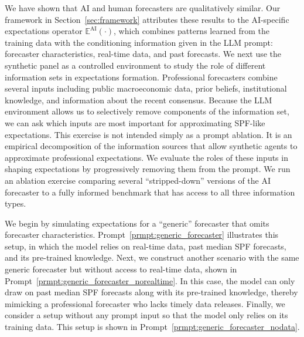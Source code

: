 \documentclass[11pt,letterpaper]{scrartcl}
\begin{document}
We have shown that AI and human forecasters are qualitatively similar. Our framework in Section~\ref{sec:framework} attributes these results to the AI-specific expectations operator \(\mathbb{E}^{\text{AI}}(\cdot)\), which combines patterns learned from the training data with the conditioning information given in the LLM prompt: forecaster characteristics, real-time data, and past forecasts. We next use the synthetic panel as a controlled environment to study the role of different information sets in expectations formation. Professional forecasters combine several inputs including public macroeconomic data, prior beliefs, institutional knowledge, and information about the recent consensus. Because the LLM environment allows us to selectively remove components of the information set, we can ask which inputs are most important for approximating SPF-like expectations. This exercise is not intended simply as a prompt ablation. It is an empirical decomposition of the information sources that allow synthetic agents to approximate professional expectations. We evaluate the roles of these inputs in shaping expectations by progressively removing them from the prompt. We run an ablation exercise comparing several ``stripped-down'' versions of the AI forecaster to a fully informed benchmark that has access to all three information types.

We begin by simulating expectations for a ``generic'' forecaster that omits forecaster characteristics. Prompt~\ref{prmpt:generic_forecaster} illustrates this setup, in which the model relies on real-time data, past median SPF forecasts, and its pre-trained knowledge. Next, we construct another scenario with the same generic forecaster but without access to real-time data, shown in Prompt~\ref{prmpt:generic_forecaster_norealtime}. In this case, the model can only draw on past median SPF forecasts along with its pre-trained knowledge, thereby mimicking a professional forecaster who lacks timely data releases. Finally, we consider a setup without any prompt input so that the model only relies on its training data. This setup is shown in Prompt~\ref{prmpt:generic_forecaster_nodata}.
\end{document}
